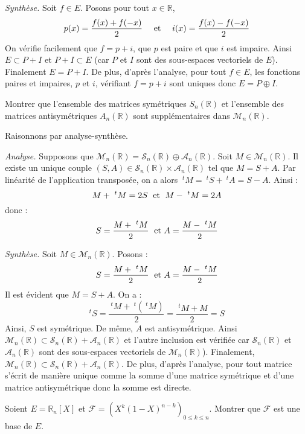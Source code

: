 \documentclass[a4paper,10pt]{report}
\begin{document}
\medskip

\noindent \textit{Synthèse.} Soit $f \in E$. Posons pour tout $x \in \mathbb{R}$,
$$ p(x) = \frac{f(x)+f(-x)}{2} \quad \hbox{ et } \quad i(x) = \frac{f(x)-f(-x)}{2} $$
On vérifie facilement que $f=p+i$, que $p$ est paire et que $i$ est impaire. Ainsi $E \subset P + I$ et $P + I \subset E$ (car $P$ et $I$ sont des sous-espaces vectoriels de $E$). Finalement $E=P+I$. De plus, d'après l'analyse, pour tout $f \in E$, les fonctions paires et impaires, $p$ et $i$, vérifiant $f=p+i$ sont uniques donc $E = P \oplus I$.


\begin{Exercice}{} Montrer que l'ensemble des matrices symétriques $S_n(\mathbb{R})$ et l'ensemble des matrices antisymétriques $A_n(\mathbb{R})$ sont supplémentaires dans $\mathcal{M}_n(\mathbb{R})$.
\end{Exercice}

\corr Raisonnons par analyse-synthèse.

\medskip

\noindent \textit{Analyse.} Supposons que $\mathcal{M}_n(\mathbb{R})= \mathcal{S}_n(\mathbb{R}) \oplus \mathcal{A}_n(\mathbb{R})$. Soit $M \in \mathcal{M}_n(\mathbb{R})$. Il existe un unique couple $(S,A) \in \mathcal{S}_n(\mathbb{R}) \times \mathcal{A}_n(\mathbb{R})$ tel que $M=S+A$. Par linéarité de l'application transposée, on a alors $~^t M = ~^t S + ~^t A = S-A$. Ainsi :
$$ M + ~^t M = 2S \; \hbox{ et } \; M- ~^tM= 2A$$
donc :
$$ S = \dfrac{M + ~^t M}{2} \; \hbox{ et } A = \dfrac{M-~^tM}{2}$$

\medskip

\noindent \textit{Synthèse.} Soit $M \in \mathcal{M}_n(\mathbb{R})$. Posons : 
$$ S = \dfrac{M + ~^t M}{2} \; \hbox{ et } A = \dfrac{M-~^tM}{2}$$
Il est évident que $M=S+A$. On a :
$$ ^t{} S = \dfrac{~^t M + ~^t(~^t M)}{2} = \dfrac{~^t M + M}{2} = S$$
Ainsi, $S$ est symétrique. De même, $A$ est antisymétrique.
 Ainsi $\mathcal{M}_n(\mathbb{R}) \subset \mathcal{S}_n(\mathbb{R}) + \mathcal{A}_n(\mathbb{R})$ et l'autre inclusion est vérifiée car $\mathcal{S}_n(\mathbb{R})$ et $\mathcal{A}_n(\mathbb{R})$ sont des sous-espaces vectoriels de $\mathcal{M}_n(\mathbb{R})$). Finalement, $\mathcal{M}_n(\mathbb{R}) \subset \mathcal{S}_n(\mathbb{R}) + \mathcal{A}_n(\mathbb{R})$. De plus, d'après l'analyse, pour tout matrice s'écrit de manière unique comme la somme d'une matrice symétrique et d'une matrice antisymétrique donc la somme est directe.

\begin{Exercice}{} Soient $E= \mathbb{R}_n[X]$ et $\mathcal{F} = (X^k(1-X)^{n-k})_{0 \leq k \leq n}$. Montrer que $\mathcal{F}$ est une base de $E$.
\end{Exercice}
\end{document}
